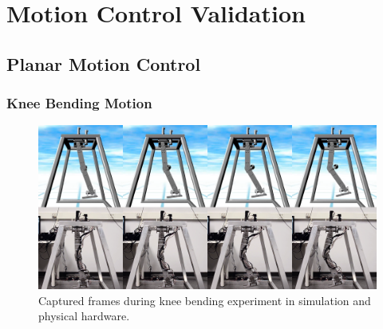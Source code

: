 
\cleardoublepage

\section{Motion Control Validation} %
\label{sec:motion_control_validation}
\Incomplete

\subsection{Planar Motion Control} %
\label{sub:planar_motion_control}

\subsubsection{Knee Bending Motion} %
\label{ssub:knee_bending_motion}
\begin{figure}[!h]
	\centering
    \includegraphics[scale=0.22]{fig/experiments/kneebendframes.png} 
  	\caption{Captured frames during knee bending experiment in simulation and physical hardware.}
	\label{fig:kneebendframes}
\end{figure}

